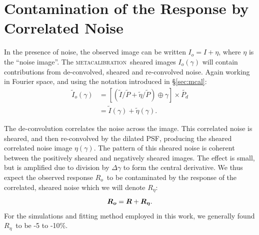 \documentclass[iop]{emulateapj}
\newcommand{\mcal}{\textsc{metacalibration}}
\newcommand{\mcalR}{\mbox{\boldmath $R$}}
\newcommand{\mcalRo}{\mbox{\boldmath $R_o$}}
\newcommand{\mcalRnoise}{\mbox{\boldmath $R_\eta$}}
\newcommand{\Itild}{\mbox{$\widetilde{I}$}}
\newcommand{\ntil}{\mbox{$\widetilde{\eta}$}}
\newcommand{\Ptil}{\mbox{$\widetilde{P}$}}
\newcommand{\Ptild}{\mbox{$\widetilde{P_d}$}}
\newcommand{\SSs}{$\left<R_{S}R_{S}\right>$}
\begin{document}

\section{Contamination of the Response by Correlated Noise} \label{sec:contam}

In the presence of noise, the observed image can be written $I_o=I+\eta$, where $\eta$
is the ``noise image''.  The \mcal\ sheared images $I_o(\gamma)$ will contain
contributions from de-convolved, sheared and re-convolved noise. Again working
in Fourier space, and using the notation introduced in \S \ref{sec:mcal}:
\begin{align}
    \Itild_o(\gamma) &= \left[ \left( \Itild/\Ptil + \ntil/\Ptil \right) \oplus \gamma \right] \times \Ptild  \nonumber \\
    &= \Itild(\gamma) + \ntil(\gamma).
\end{align}

The de-convolution correlates the noise across the image.  This correlated
noise is sheared, and then re-convolved by the dilated PSF, producing the
sheared correlated noise image $\eta(\gamma)$.  The pattern of this sheared
noise is coherent between the positively sheared and negatively sheared images.
The effect is small, but is amplified due to division by $\Delta \gamma$ to
form the central derivative.  We thus expect the observed response \mcalRo\ to
be contaminated by the response of the correlated, sheared noise which
we will denote \mcalRnoise:
\begin{equation}
    \mbox{\mcalRo}  =  \mcalR + \mbox{\mcalRnoise}.
\end{equation}
For the simulations and fitting method employed in this work, we generally
found \mcalRnoise\ to be -5 to -10\%.
\end{document}
